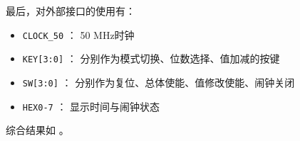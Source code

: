 \documentclass[lang=cn,11pt,a4paper,cite=authoryear]{elegantpaper}
\begin{document}
最后，对外部接口的使用有：  

\begin{itemize}
    \item \texttt{CLOCK\_50} ： 50 MHz时钟
    \item \texttt{KEY[3:0]} ： 分别作为模式切换、位数选择、值加减的按键
    \item \texttt{SW[3:0]} ： 分别作为复位、总体使能、值修改使能、闹钟关闭
    \item \texttt{HEX0-7} ： 显示时间与闹钟状态
\end{itemize}


综合结果如  。


\end{document}
